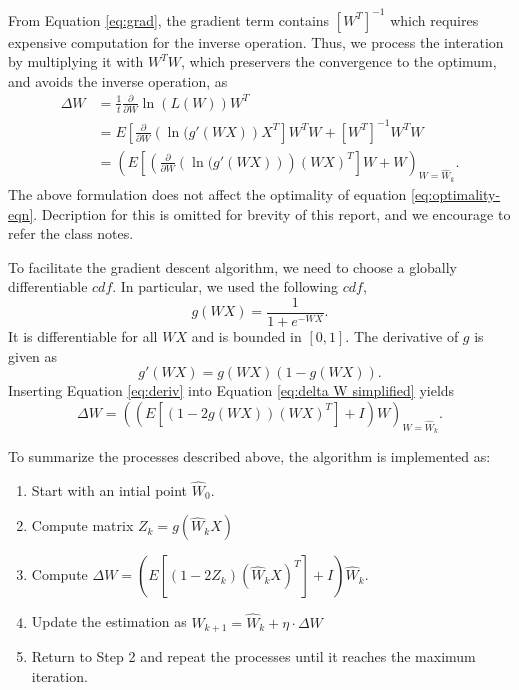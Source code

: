 \documentclass[conference]{IEEEtran}
\begin{document}
From Equation \ref{eq:grad}, the gradient term contains $\left[W^T\right]^{-1}$ which requires expensive computation for the inverse operation. 
Thus, we process the interation by multiplying it with $W^TW$, which preservers the convergence to the optimum, and avoids the inverse operation, as
\begin{equation}
\begin{aligned}
    \Delta W
    &= \frac{1}{t}\frac{\partial}{\partial W}\ln(L(W)) W^T \\
    &= E\left[\frac{\partial}{\partial W}(\ln{(g'(WX)})X^T\right] W^TW + \left[W^T\right]^{-1} W^TW \\
    &= \left(E\left[\left(\frac{\partial}{\partial W}(\ln{(g'(WX)})\right)(WX)^T\right] W + W\right)_{W=\hat{W}_k}.
    \label{eq:delta W simplified}
\end{aligned}
\end{equation}
The above formulation does not affect the  optimality of equation \ref{eq:optimality-eqn}. Decription for this is omitted for brevity of this report, and we encourage to refer the class notes.

To facilitate the gradient descent algorithm, we need to choose a globally differentiable $cdf$. In particular, we used the following $cdf$,
\begin{equation}
    g(WX) = \frac{1}{1+e^{-WX}}.
\end{equation}
It is differentiable for all $WX$ and is bounded in $\left[0,1 \right]$. The derivative of $g$ is given as
\begin{equation}
\label{eq:deriv}
    g'(WX) = g(WX)(1-g(WX)).
\end{equation}
Inserting Equation \ref{eq:deriv} into Equation \ref{eq:delta W simplified} yields
\begin{equation}
    \Delta W = \left(\left(E\left[(1-2g(WX))(WX)^T\right] + I \right)W\right)_{W=\hat{W}_k}.
\end{equation}

To summarize the processes described above, the algorithm is implemented as:
\begin{enumerate}
    \item Start with an intial point $\hat{W}_0$.  
    \item Compute matrix $Z_k = g(\hat{W}_kX)$
    \item Compute $\Delta W = \left(E\left[(1-2Z_k)(\hat{W}_kX)^T\right] + I \right)\hat{W}_k$.
    \item Update the estimation as $\hat{W}_{k+1} = \hat{W}_k + \eta\cdot\Delta W$
    \item Return to Step 2 and repeat the processes until it reaches the maximum iteration.
\end{enumerate}
\end{document}

